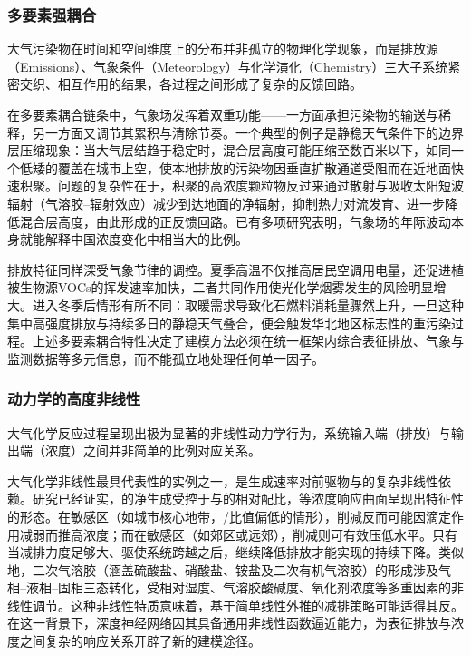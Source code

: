 \subsubsection{多要素强耦合}

大气污染物在时间和空间维度上的分布并非孤立的物理化学现象，而是排放源（Emissions）、气象条件（Meteorology）与化学演化（Chemistry）三大子系统紧密交织、相互作用的结果，各过程之间形成了复杂的反馈回路\citep{jacob2000heterogeneous,seinfeld2016atmospheric}。

在多要素耦合链条中，气象场发挥着双重功能——一方面承担污染物的输送与稀释，另一方面又调节其累积与清除节奏。一个典型的例子是静稳天气条件下的边界层压缩现象：当大气层结趋于稳定时，混合层高度可能压缩至数百米以下，如同一个低矮的覆盖在城市上空，使本地排放的污染物因垂直扩散通道受阻而在近地面快速积聚\citep{zhong2018feedback}。问题的复杂性在于，积聚的高浓度颗粒物反过来通过散射与吸收太阳短波辐射（气溶胶--辐射效应）减少到达地面的净辐射，抑制热力对流发育、进一步降低混合层高度，由此形成的正反馈回路\citep{huang2014high,wang2016persistent}。已有多项研究表明，气象场的年际波动本身就能解释中国\PM 浓度变化中相当大的比例\citep{zhang2019drivers,chen2020influence}。

排放特征同样深受气象节律的调控。夏季高温不仅推高居民空调用电量，还促进植被生物源VOCs的挥发速率加快，二者共同作用使光化学烟雾发生的风险明显增大\citep{ma2019substantial}。进入冬季后情形有所不同：取暖需求导致化石燃料消耗量骤然上升，一旦这种集中高强度排放与持续多日的静稳天气叠合，便会触发华北地区标志性的\PM 重污染过程\citep{chen2020influence}。上述多要素耦合特性决定了建模方法必须在统一框架内综合表征排放、气象与监测数据等多元信息，而不能孤立地处理任何单一因子。

\subsubsection{动力学的高度非线性}

大气化学反应过程呈现出极为显著的非线性动力学行为，系统输入端（排放）与输出端（浓度）之间并非简单的比例对应关系\citep{seinfeld2016atmospheric}。

大气化学非线性最具代表性的实例之一，是\ozone 生成速率对前驱物\NOx 与\VOCs 的复杂非线性依赖。研究已经证实，\ozone 的净生成受控于\NOx 与\VOCs 的相对配比，等浓度响应曲面呈现出特征性的形态\citep{sillman1999relation}。在\VOCs 敏感区（如城市核心地带，\VOCs/\NOx 比值偏低的情形），削减\NOx 反而可能因滴定作用减弱而推高\ozone 浓度；而在\NOx 敏感区（如郊区或远郊），削减\NOx 则可有效压低\ozone 水平\citep{xing2020deep,liu2023drivers}。只有当减排力度足够大、驱使系统跨越之后，继续降低\NOx 排放才能实现\ozone 的持续下降\citep{huang2020large}。类似地，二次气溶胶（涵盖硫酸盐、硝酸盐、铵盐及二次有机气溶胶）的形成涉及气相--液相--固相三态转化，受相对湿度、气溶胶酸碱度、氧化剂浓度等多重因素的非线性调节\citep{guo2014elucidating,wang2016persistent}。这种非线性特质意味着，基于简单线性外推的减排策略可能适得其反。在这一背景下，深度神经网络因其具备通用非线性函数逼近能力，为表征排放与浓度之间复杂的响应关系开辟了新的建模途径。

